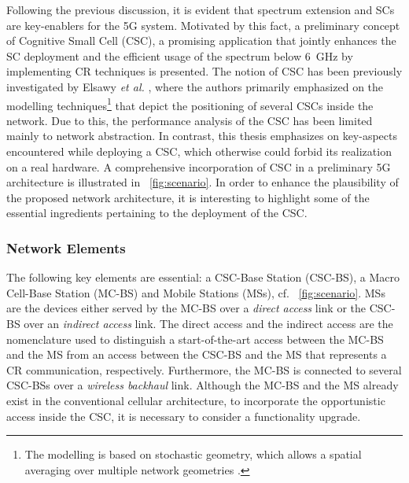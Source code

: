 Following the previous discussion, it is evident that spectrum extension and SCs are key-enablers for the 5G system.
Motivated by this fact, a preliminary concept of Cognitive Small Cell (CSC), a promising application that jointly enhances the SC deployment and the efficient usage of the spectrum below \SI{6}{GHz} by implementing CR techniques is presented. The notion of CSC has been previously investigated by Elsawy \textit{et al.} \cite{Elsawy13, Elsawy13_cmag}, where the authors primarily emphasized on the modelling techniques\footnote{The modelling is based on stochastic geometry, which allows a spatial averaging over multiple network geometries \cite{Haenggi, Haenggi08now}.} that depict the positioning of several CSCs inside the network. Due to this, the performance analysis of the CSC has been limited mainly to network abstraction. In contrast, this thesis emphasizes on key-aspects encountered while deploying a CSC, which otherwise could forbid its realization on a real hardware. %
 A comprehensive incorporation of CSC in a preliminary 5G architecture is illustrated in \figurename~\ref{fig:scenario}. In order to enhance the plausibility of the proposed network architecture, it is interesting to highlight some of the essential ingredients pertaining to the deployment of the CSC.

\subsubsection*{Network Elements}
 The following key elements are essential: a CSC-Base Station (CSC-BS), a Macro Cell-Base Station (MC-BS) and Mobile Stations (MSs), cf. \figurename~\ref{fig:scenario}. MSs are the devices either served by the MC-BS over a \textit{direct access} link or the CSC-BS over an \textit{indirect access} link. The direct access and the indirect access are the nomenclature used to distinguish a start-of-the-art access between the MC-BS and the MS from an access between the CSC-BS and the MS that represents a CR communication, respectively. Furthermore, the MC-BS is connected to several CSC-BSs over a \textit{wireless backhaul} link. Although the MC-BS and the MS already exist in the conventional cellular architecture, to incorporate the opportunistic access inside the CSC, it is necessary to consider a functionality upgrade.

